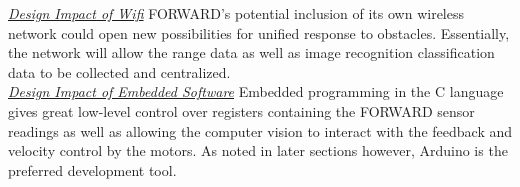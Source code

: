 \noindent \underline{\textit{Design Impact of Wifi}}
FORWARD's potential inclusion of its own wireless network could open new possibilities for unified response to obstacles. Essentially, the network will allow the range data as well as image recognition classification data to be collected and centralized.\\

\noindent \underline{\textit{Design Impact of Embedded Software}}
Embedded programming in the C language gives great low-level control over registers containing the FORWARD sensor readings as well as allowing the computer vision to interact with the feedback and velocity control by the motors. As noted in later sections however, Arduino is the preferred development tool.\\

